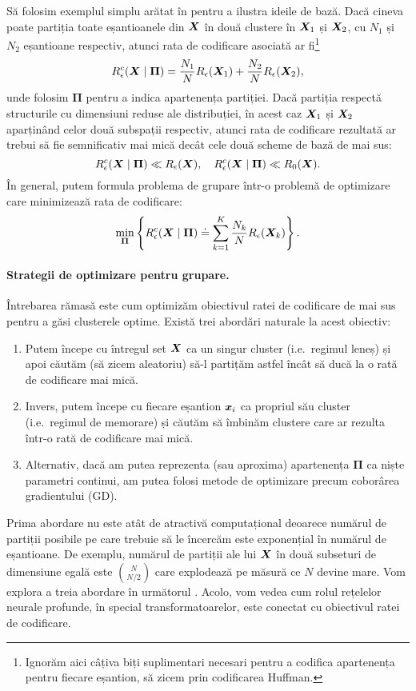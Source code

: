 \documentclass[../../book-main_ro.tex]{subfiles}
\begin{document}
Să folosim exemplul simplu arătat în  pentru a ilustra ideile de bază. Dacă cineva poate partiția toate eșantioanele din $\bm{X}$ în două clustere în $\bm{X}_1$ și $\bm{X}_2$, cu $N_1$ și $N_2$ eșantioane respectiv, atunci rata de codificare asociată ar fi\footnote{Ignorăm aici câțiva biți suplimentari necesari pentru a codifica apartenența pentru fiecare eșantion, să zicem prin codificarea Huffman.}
\begin{equation}
	R_{\epsilon}^c(\bm{X}\mid \boldsymbol{\Pi}) = \frac{N_1}{N}R_{\epsilon}(\bm{X}_1) + \frac{N_2}{N}R_{\epsilon}(\bm{X}_2),
\end{equation}
unde folosim $\boldsymbol{\Pi}$ pentru a indica apartenența partiției. Dacă partiția respectă structurile cu dimensiuni reduse ale distribuției, în acest caz $\bm{X}_1$ și $\bm{X}_2$ aparținând celor două subspații respectiv, atunci rata de codificare rezultată ar trebui să fie semnificativ mai mică decât cele două scheme de bază de mai sus:
\begin{equation}
	R_{\epsilon}^c(\bm{X} \mid \boldsymbol{\Pi}) \ll R_{\epsilon}(\bm{X}), \quad     R_{\epsilon}^c(\bm{X} \mid \boldsymbol{\Pi}) \ll R_0(\bm{X}).
\end{equation}
În general, putem formula problema de grupare într-o problemă de optimizare care minimizează rata de codificare:
\begin{equation}
	\min_{\boldsymbol{\Pi}}  \left\{ R_{\epsilon}^c(\bm{X} \mid \boldsymbol{\Pi})
	\doteq \sum_{k=1}^K \frac{N_k}{N}R_{\epsilon}(\bm{X}_k)\right\}.
\end{equation}

\paragraph{Strategii de optimizare pentru grupare.}
Întrebarea rămasă este cum optimizăm obiectivul ratei de codificare de mai sus pentru a găsi clusterele optime. Există trei abordări naturale la acest obiectiv:
\begin{enumerate}
	\item Putem începe cu întregul set $\bm{X}$ ca un singur cluster (i.e.\ regimul leneș) și apoi căutăm (să zicem aleatoriu) să-l partițăm astfel încât să ducă la o rată de codificare mai mică.
	\item Invers, putem începe cu fiecare eșantion $\bm{x}_i$ ca propriul său cluster (i.e.\ regimul de memorare) și căutăm să îmbinăm clustere care ar rezulta într-o rată de codificare mai mică.
	\item Alternativ, dacă am putea reprezenta (sau aproxima) apartenența $\boldsymbol{\Pi}$ ca niște parametri continui, am putea folosi metode de optimizare precum coborârea gradientului (GD).
\end{enumerate}
Prima abordare nu este atât de atractivă computațional deoarece numărul de partiții posibile pe care trebuie să le încercăm este exponențial în numărul de eșantioane. De exemplu, numărul de partiții ale lui $\bm{X}$ în două subseturi de dimensiune egală este $N \choose N/2$ care explodează pe măsură ce $N$ devine mare. Vom explora a treia abordare în următorul . Acolo, vom vedea cum rolul rețelelor neurale profunde, în special transformatoarelor, este conectat cu obiectivul ratei de codificare.
\end{document}
